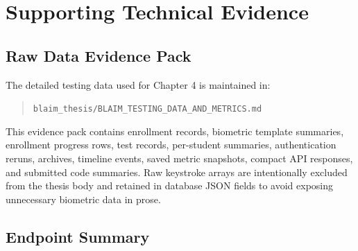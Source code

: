 \chapter{Supporting Technical Evidence}
\label{app:supporting-evidence}

\section{Raw Data Evidence Pack}
\label{app:raw-data-pack}

The detailed testing data used for Chapter 4 is maintained in:

\begin{quote}
\texttt{blaim\_thesis/BLAIM\_TESTING\_DATA\_AND\_METRICS.md}
\end{quote}

This evidence pack contains enrollment records, biometric template summaries, enrollment progress rows, test records, per-student summaries, authentication reruns, archives, timeline events, saved metric snapshots, compact API responses, and submitted code summaries. Raw keystroke arrays are intentionally excluded from the thesis body and retained in database JSON fields to avoid exposing unnecessary biometric data in prose.

\section{Endpoint Summary}
\label{app:endpoint-summary}

